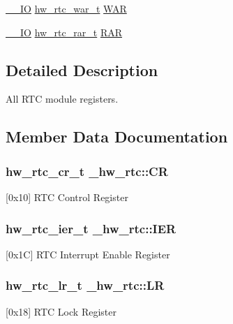 \begin{DoxyCompactItemize}
\item 
\hyperlink{core__sc300_8h_aec43007d9998a0a0e01faede4133d6be}{\+\_\+\+\_\+\+IO} \hyperlink{union__hw__rtc__war}{hw\+\_\+rtc\+\_\+war\+\_\+t} \hyperlink{struct__hw__rtc_a2aa4d85ac8b5b0f1821131e6c442b876}{W\+AR}
\item 
\hyperlink{core__sc300_8h_aec43007d9998a0a0e01faede4133d6be}{\+\_\+\+\_\+\+IO} \hyperlink{union__hw__rtc__rar}{hw\+\_\+rtc\+\_\+rar\+\_\+t} \hyperlink{struct__hw__rtc_ac76bf33bbadf6eae55d99f2f060052c1}{R\+AR}
\end{DoxyCompactItemize}


\subsection{Detailed Description}
All R\+TC module registers. 

\subsection{Member Data Documentation}
\subsubsection[{\texorpdfstring{CR}{CR}}]{ {\bf hw\+\_\+rtc\+\_\+cr\+\_\+t} \+\_\+hw\+\_\+rtc\+::\+CR}\hypertarget{struct__hw__rtc_a04684e99db8deadb2b8acbb1fa304d95}{}\label{struct__hw__rtc_a04684e99db8deadb2b8acbb1fa304d95}
\mbox{[}0x10\mbox{]} R\+TC Control Register 
\subsubsection[{\texorpdfstring{I\+ER}{IER}}]{ {\bf hw\+\_\+rtc\+\_\+ier\+\_\+t} \+\_\+hw\+\_\+rtc\+::\+I\+ER}\hypertarget{struct__hw__rtc_a01ec0cb43cfa1ddb91b867cc40bcf797}{}\label{struct__hw__rtc_a01ec0cb43cfa1ddb91b867cc40bcf797}
\mbox{[}0x1C\mbox{]} R\+TC Interrupt Enable Register 
\subsubsection[{\texorpdfstring{LR}{LR}}]{ {\bf hw\+\_\+rtc\+\_\+lr\+\_\+t} \+\_\+hw\+\_\+rtc\+::\+LR}\hypertarget{struct__hw__rtc_a64caa291e61f4f375eccd4d44ccceb8e}{}\label{struct__hw__rtc_a64caa291e61f4f375eccd4d44ccceb8e}
\mbox{[}0x18\mbox{]} R\+TC Lock Register 
